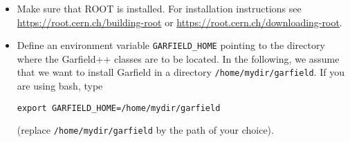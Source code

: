 \begin{itemize}
  \item
  Make sure that ROOT is installed. For installation instructions 
  see \url{https://root.cern.ch/building-root} or
  \url{https://root.cern.ch/downloading-root}.
  \item
  Define an environment variable \texttt{GARFIELD\_HOME} 
  pointing to the directory where the Garfield++ classes 
  are to be located.
  In the following, we assume that we want to install Garfield 
  in a directory \texttt{/home/mydir/garfield}.
  If you are using bash, type
  \begin{lstlisting}
export GARFIELD_HOME=/home/mydir/garfield
  \end{lstlisting} 
  (replace \texttt{/home/mydir/garfield} by the path of your choice).
  

\end{itemize}
